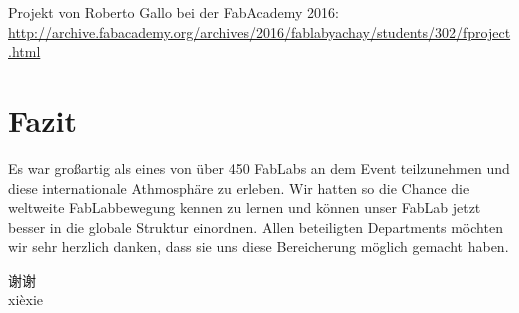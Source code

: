 \documentclass{\basedir/fablab-document}
\begin{document}
Projekt von Roberto Gallo bei der FabAcademy 2016:\\ \url{http://archive.fabacademy.org/archives/2016/fablabyachay/students/302/fproject.html}

\section*{Fazit}\label{fazit}

Es war großartig als eines von über 450 FabLabs an dem
Event teilzunehmen und diese internationale Athmosphäre zu erleben. Wir
hatten so die Chance die weltweite FabLabbewegung kennen zu lernen und
können unser FabLab jetzt besser in die globale Struktur einordnen.
Allen beteiligten Departments möchten wir sehr herzlich danken, dass sie
uns diese Bereicherung möglich gemacht haben.

\vspace{1cm}
\LARGE
\centering
\begin{CJK}{UTF8}{gbsn}
	谢谢\\
	xi\`exie
\end{CJK}
	
\end{document}
